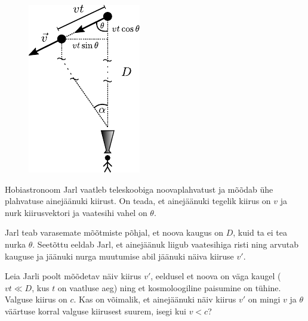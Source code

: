 \documentclass[10pt]{article}
\begin{document}
\begin{figure}
		\vspace{10pt}
		\includegraphics[width=1.1\linewidth]{2020-lahg-04-yl.pdf}
	\end{figure}
	Hobiastronoom Jarl vaatleb teleskoobiga noovaplahvatust ja mõõdab ühe plahvatuse ainejäänuki kiirust. On teada, et ainejäänuki tegelik kiirus on $v$ ja nurk kiirusvektori ja vaatesihi vahel on $\theta$.
	
	Jarl teab varasemate mõõtmiste põhjal, et noova kaugus on $D$, kuid ta ei tea nurka $\theta$. Seetõttu eeldab Jarl, et ainejäänuk liigub vaatesihiga risti ning arvutab kauguse ja jäänuki nurga muutumise abil jäänuki näiva kiiruse $v'$.
	
	Leia Jarli poolt mõõdetav näiv kiirus $v'$, eeldusel et noova on väga kaugel ($vt \ll D$, kus $t$ on vaatluse aeg) ning et kosmoloogiline paisumine on tühine. Valguse kiirus on $c$. Kas on võimalik, et ainejäänuki näiv kiirus $v'$ on mingi $v$ ja $\theta$ väärtuse korral valguse kiirusest suurem, isegi kui $v < c$?
\probend
\bigskip
\end{document}
